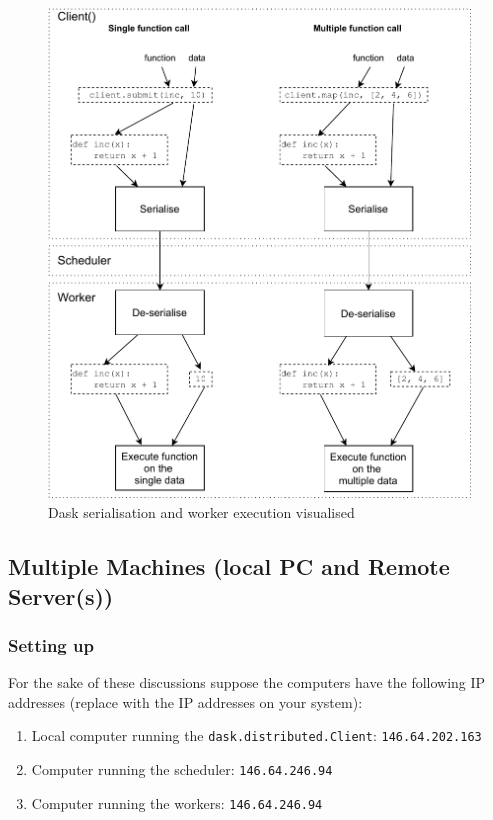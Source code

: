 \begin{figure}[htbp]
    \centering
\includegraphics[width=.8\textwidth]{pic/DaskSerialisation02}
    \caption{Dask serialisation and worker execution visualised}
    \label{fig:DaskSerialisation02}
\end{figure}


\subsection{Multiple Machines (local PC and Remote Server(s))}
\label{sec:MultipleMachineslocalPCandRemoteServers}


\subsubsection{Setting up}
\label{sec:Settingup}

For the sake of these discussions suppose the computers have the following  IP addresses (replace with the IP addresses on your system):
\begin{enumerate}
\item Local computer running the \verb+dask.distributed.Client+:  \verb+146.64.202.163+
\item Computer running the scheduler: \verb+146.64.246.94+
\item Computer running the workers: \verb+146.64.246.94+
\end{enumerate}



